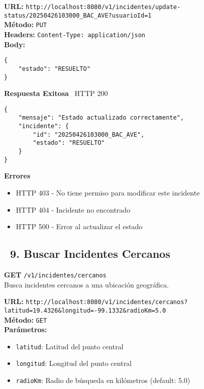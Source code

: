 \begin{tcolorbox}[request]
    \textbf{URL:} \textcolor{urlColor}{\texttt{http://localhost:8080/v1/incidentes/update-status/20250426103000\_BAC\_AVE?usuarioId=1}}\\
    \textbf{Método:} \textcolor{methodColor}{\texttt{PUT}}\\
    \textbf{Headers:} \textcolor{headerColor}{\texttt{Content-Type: application/json}}\\
    \textbf{Body:}
    \begin{verbatim}
{
    "estado": "RESUELTO"
}
    \end{verbatim}
\end{tcolorbox}

\begin{tcolorbox}[response]
    \textbf{Respuesta Exitosa} \faCheckCircle\ \textcolor{successColor}{HTTP 200}
    \begin{verbatim}
{
    "mensaje": "Estado actualizado correctamente",
    "incidente": {
        "id": "20250426103000_BAC_AVE",
        "estado": "RESUELTO"
    }
}
    \end{verbatim}
    \textbf{Errores}
    \begin{itemize}
        \item \textcolor{errorColor}{HTTP 403} - No tiene permiso para modificar este incidente
        \item \textcolor{errorColor}{HTTP 404} - Incidente no encontrado
        \item \textcolor{errorColor}{HTTP 500} - Error al actualizar el estado
    \end{itemize}
\end{tcolorbox}


\newpage

\subsection*{\faServer\ 9. Buscar Incidentes Cercanos}
\begin{tcolorbox}[endpoint]
    \textbf{GET} \texttt{/v1/incidentes/cercanos}\\
    Busca incidentes cercanos a una ubicación geográfica.
\end{tcolorbox}

\begin{tcolorbox}[request]
    \textbf{URL:} \textcolor{urlColor}{\texttt{http://localhost:8080/v1/incidentes/cercanos?latitud=19.4326\&longitud=-99.1332\&radioKm=5.0}}\\
    \textbf{Método:} \textcolor{methodColor}{\texttt{GET}}\\
    \textbf{Parámetros:}
    \begin{itemize}
        \item \texttt{latitud}: Latitud del punto central
        \item \texttt{longitud}: Longitud del punto central
        \item \texttt{radioKm}: Radio de búsqueda en kilómetros (default: 5.0)
    \end{itemize}
\end{tcolorbox}


